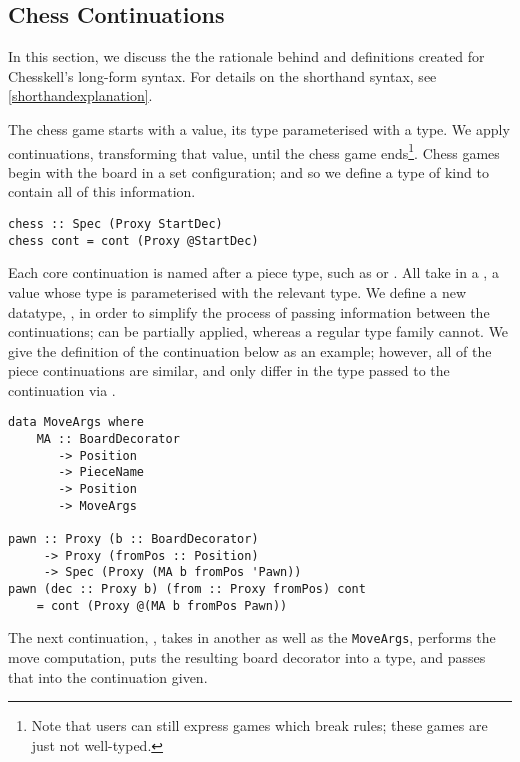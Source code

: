 \subsection{Chess Continuations}

In this section, we discuss the the rationale behind and definitions created for Chesskell's long-form syntax. For details on the shorthand syntax, see \cref{shorthandexplanation}.

The chess game starts with a  value, its type parameterised with a  type. We apply continuations, transforming that value, until the chess game ends\footnote{Note that users can still express games which break rules; these games are just not well-typed.}. Chess games begin with the board in a set configuration; and so we define a type  of kind  to contain all of this information.

\begin{lstlisting}
chess :: Spec (Proxy StartDec)
chess cont = cont (Proxy @StartDec)
\end{lstlisting}

Each core continuation is named after a piece type, such as  or . All take in a , a  value whose type is parameterised with the relevant  type. We define a new datatype, , in order to simplify the process of passing information between the continuations;  can be partially applied, whereas a regular type family cannot. We give the definition of the  continuation below as an example; however, all of the piece continuations are similar, and only differ in the  type passed to the continuation via .

\begin{lstlisting}
data MoveArgs where
    MA :: BoardDecorator
       -> Position
       -> PieceName
       -> Position
       -> MoveArgs

pawn :: Proxy (b :: BoardDecorator)
     -> Proxy (fromPos :: Position)
     -> Spec (Proxy (MA b fromPos 'Pawn))
pawn (dec :: Proxy b) (from :: Proxy fromPos) cont
    = cont (Proxy @(MA b fromPos Pawn))
\end{lstlisting}

The next continuation, , takes in another  as well as the \lstinline{MoveArgs}, performs the move computation, puts the resulting board decorator into a  type, and passes that  into the continuation given.

